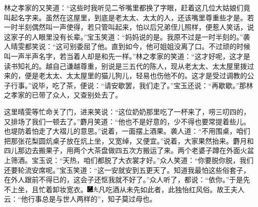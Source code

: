 林之孝家的又笑道：“这些时我听见二爷嘴里都换了字眼，赶着这几位大姑娘们竟叫起名字来。虽然在这屋里，到底是老太太、太太的人，还该嘴里尊重些才是。若一时半刻偶然叫一声使得，若只管叫起来，怕以后兄弟侄儿照样，便惹人笑话，说这家子的人眼里没有长辈。”宝玉笑道：“妈妈说的是。我原不过是一时半刻的。”袭人晴雯都笑说：“这可别委屈了他。直到如今，他可姐姐没离了口。不过顽的时候叫一声半声名字，若当着人却是和先一样。”林之孝家的笑道：“这才好呢，这才是读书知礼的。越自己谦越尊重，别说是三五代的陈人，现从老太太、太太屋里拨过来的，便是老太太、太太屋里的猫儿狗儿，轻易也伤他不的。这才是受过调教的公子行事。”说毕，吃了茶，便说：“请安歇罢，我们走了。”宝玉还说：“再歇歇。”那林之孝家的已带了众人，又查别处去了。

这里晴雯等忙命关了门，进来笑说：“这位奶奶那里吃了一杯来了，唠三叨四的，又排场了我们一顿去了。”麝月笑道：“他也不是好意的，少不得也要常提着些儿。也堤防着怕走了大褶儿的意思。”说着，一面摆上酒果。袭人道：“不用围桌，咱们把那张花梨圆炕桌子放在炕上坐，又宽绰，又便宜。”说着，大家果然抬来。麝月和四儿那边去搬果子，用两个大茶盘做四五次方搬运了来。两个老婆子蹲在外面火盆上筛酒。宝玉说：“天热，咱们都脱了大衣裳才好。”众人笑道：“你要脱你脱，我们还要轮流安席呢。”宝玉笑道：“这一安就安到五更天了。知道我最怕这些俗套子，在外人跟前不得已的，这会子还怄我就不好了。”众人听了，都说：“依你。”于是先不上坐，且忙着卸妆宽衣。{\includegraphics[width=3mm]{../Images/00003}\includegraphics[width=3mm]{../Images/00012}\footnotesize \kaishu 凡吃酒从未先如此者，此独怡红风俗。故王夫人云：“他行事总是与世人两样的”，知子莫过母也。}

